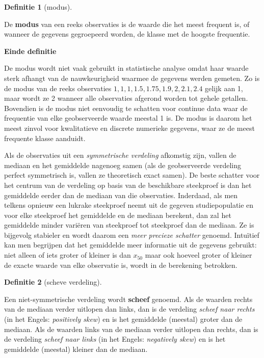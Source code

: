 \documentclass[
  12pt,dutch,coursenotes]{book}
\theoremstyle{definition}
\newtheorem{definition}{Definitie}[chapter]
\theoremstyle{definition}
\theoremstyle{definition}
\theoremstyle{definition}
\theoremstyle{remark}
\begin{document}
\begin{definition}[modus]
\protect\hypertarget{def:unnamed-chunk-97}{}{\label{def:unnamed-chunk-97} {} }
\end{definition}
De \textbf{modus} van een reeks observaties is de waarde die het meest
frequent is, of wanneer de gegevens gegroepeerd worden, de klasse met de
hoogste frequentie.

\textbf{Einde definitie}

De modus wordt niet vaak gebruikt in statistische analyse omdat haar waarde
sterk afhangt van de nauwkeurigheid waarmee de gegevens werden gemeten. Zo
is de modus van de reeks observaties \(1, 1, 1, 1.5, 1.75, 1.9, 2, 2.1, 2.4\)
gelijk aan 1, maar wordt ze 2 wanneer alle observaties afgerond worden tot
gehele getallen. Bovendien is de modus niet eenvoudig te schatten voor
continue data waar de frequentie van elke geobserveerde waarde meestal 1 is.
De modus is daarom het meest zinvol voor kwalitatieve en discrete numerieke
gegevens, waar ze de meest frequente klasse aanduidt.

Als de observaties uit een \emph{symmetrische verdeling} afkomstig zijn,
vallen de mediaan en het gemiddelde nagenoeg samen (als de geobserveerde
verdeling perfect symmetrisch is, vallen ze theoretisch exact samen).
De beste schatter voor het centrum van de verdeling op basis van de beschikbare
steekproef is dan het gemiddelde eerder dan de mediaan van die observaties.
Inderdaad, als men telkens opnieuw een lukrake steekproef neemt uit de
gegeven studiepopulatie en voor elke steekproef het gemiddelde en de mediaan
berekent, dan zal het gemiddelde minder variëren van steekproef tot
steekproef dan de mediaan. Ze is bijgevolg stabieler en wordt daarom een
\emph{meer precieze schatter} genoemd. Intuïtief kan men begrijpen dat
het gemiddelde meer informatie uit de gegevens gebruikt: niet alleen of iets
groter of kleiner is dan \(x_{50}\) maar ook hoeveel groter of kleiner de
exacte waarde van elke observatie is, wordt in de berekening betrokken.

\begin{definition}[scheve verdeling]
\protect\hypertarget{def:unnamed-chunk-98}{}{\label{def:unnamed-chunk-98} {} }
\end{definition}
Een niet-symmetrische verdeling wordt \textbf{scheef} genoemd. Als de
waarden rechts van de mediaan verder uitlopen dan links, dan is de verdeling
\emph{scheef naar rechts} (in het Engels: \emph{positively skew}) en is
het gemiddelde (meestal) groter dan de mediaan. Als de waarden links van de
mediaan verder uitlopen dan rechts, dan is de verdeling \emph{scheef naar
links} (in het Engels: \emph{negatively skew}) en is het gemiddelde
(meestal) kleiner dan de mediaan.
\end{document}
